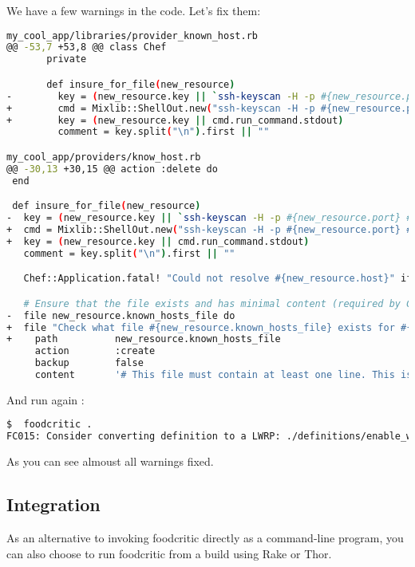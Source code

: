 We have a few warnings in the code. Let's fix them:

\begin{lstlisting}[language=Bash,label=lst:testing-foodcritic3]
my_cool_app/libraries/provider_known_host.rb
@@ -53,7 +53,8 @@ class Chef
       private

       def insure_for_file(new_resource)
-        key = (new_resource.key || `ssh-keyscan -H -p #{new_resource.port} #{new_resource.host} 2>&1`)
+        cmd = Mixlib::ShellOut.new("ssh-keyscan -H -p #{new_resource.port} #{new_resource.host} 2>&1")
+        key = (new_resource.key || cmd.run_command.stdout)
         comment = key.split("\n").first || ""

my_cool_app/providers/know_host.rb
@@ -30,13 +30,15 @@ action :delete do
 end

 def insure_for_file(new_resource)
-  key = (new_resource.key || `ssh-keyscan -H -p #{new_resource.port} #{new_resource.host} 2>&1`)
+  cmd = Mixlib::ShellOut.new("ssh-keyscan -H -p #{new_resource.port} #{new_resource.host} 2>&1")
+  key = (new_resource.key || cmd.run_command.stdout)
   comment = key.split("\n").first || ""

   Chef::Application.fatal! "Could not resolve #{new_resource.host}" if key =~ /getaddrinfo/

   # Ensure that the file exists and has minimal content (required by Chef::Util::FileEdit)
-  file new_resource.known_hosts_file do
+  file "Check what file #{new_resource.known_hosts_file} exists for #{new_resource.name}" do
+    path          new_resource.known_hosts_file
     action        :create
     backup        false
     content       '# This file must contain at least one line. This is that line.'
\end{lstlisting}

And run again :

\begin{lstlisting}[language=Bash,label=lst:testing-foodcritic2]
$  foodcritic .
FC015: Consider converting definition to a LWRP: ./definitions/enable_web_site.rb:1
\end{lstlisting}

As you can see almoust all warnings fixed.

\subsection{Integration}

As an alternative to invoking foodcritic directly as a command-line program, you can also choose to run foodcritic from a build using Rake or Thor.

